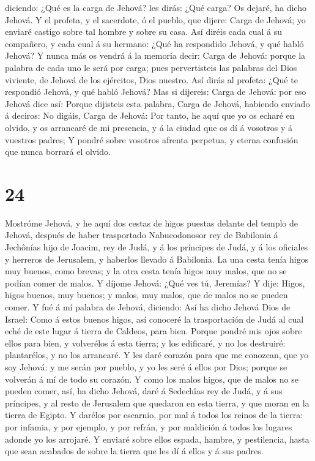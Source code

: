 diciendo: ¿Qué es la carga de Jehová? les dirás: ¿Qué carga? Os dejaré,
ha dicho Jehová.  Y el profeta, y el sacerdote, ó el
pueblo, que dijere: Carga de Jehová; yo enviaré castigo sobre tal hombre
y sobre su casa.  Así diréis cada cual á su compañero, y
cada cual á su hermano: ¿Qué ha respondido Jehová, y qué habló Jehová?
 Y nunca más os vendrá á la memoria decir: Carga de
Jehová: porque la palabra de cada uno le será por carga; pues
pervertisteis las palabras del Dios viviente, de Jehová de los
ejércitos, Dios nuestro.  Así dirás al profeta: ¿Qué te
respondió Jehová, y qué habló Jehová?  Mas si dijereis:
Carga de Jehová: por eso Jehová dice así: Porque dijisteis esta palabra,
Carga de Jehová, habiendo enviado á deciros: No digáis, Carga de Jehová:
 Por tanto, he aquí que yo os echaré en olvido, y os
arrancaré de mi presencia, y á la ciudad que os dí á vosotros y á
vuestros padres;  Y pondré sobre vosotros afrenta
perpetua, y eterna confusión que nunca borrará el olvido.

\hypertarget{section-23}{%
\section{24}\label{section-23}}

 Mostróme Jehová, y he aquí dos cestas de higos puestas
delante del templo de Jehová, después de haber trasportado Nabucodonosor
rey de Babilonia á Jechônías hijo de Joacim, rey de Judá, y á los
príncipes de Judá, y á los oficiales y herreros de Jerusalem, y haberlos
llevado á Babilonia.  La una cesta tenía higos muy buenos,
como brevas; y la otra cesta tenía higos muy malos, que no se podían
comer de malos.  Y díjome Jehová: ¿Qué ves tú, Jeremías? Y
dije: Higos, higos buenos, muy buenos; y malos, muy malos, que de malos
no se pueden comer.  Y fué á mí palabra de Jehová,
diciendo:  Así ha dicho Jehová Dios de Israel: Como á
estos buenos higos, así conoceré la trasportación de Judá al cual eché
de este lugar á tierra de Caldeos, para bien.  Porque
pondré mis ojos sobre ellos para bien, y volverélos á esta tierra; y los
edificaré, y no los destruiré: plantarélos, y no los arrancaré.
 Y les daré corazón para que me conozcan, que yo soy
Jehová: y me serán por pueblo, y yo les seré á ellos por Dios; porque se
volverán á mí de todo su corazón.  Y como los malos higos,
que de malos no se pueden comer, así, ha dicho Jehová, daré á Sedechîas
rey de Judá, y á sus príncipes, y al resto de Jerusalem que quedaron en
esta tierra, y que moran en la tierra de Egipto.  Y
darélos por escarnio, por mal á todos los reinos de la tierra: por
infamia, y por ejemplo, y por refrán, y por maldición á todos los
lugares adonde yo los arrojaré.  Y enviaré sobre ellos
espada, hambre, y pestilencia, hasta que sean acabados de sobre la
tierra que les dí á ellos y á sus padres.

